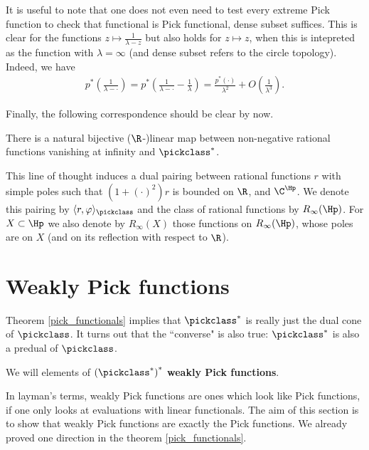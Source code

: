 It is useful to note that one does not even need to test every extreme Pick function to check that functional is Pick functional, dense subset suffices. This is clear for the functions $z \mapsto \frac{1}{\lambda - z}$ but also holds for $z \mapsto z$, when this is intepreted as the function with $\lambda = \infty$ (and dense subset refers to the circle topology). Indeed, we have
\begin{align*}
	p^{*}\left(\frac{1}{\lambda - \cdot}\right) = p^{*}\left(\frac{1}{\lambda - \cdot} - \frac{1}{\lambda}\right) = \frac{p^{*}(\cdot)}{\lambda^2} + O\left(\frac{1}{\lambda^3}\right).
\end{align*}

Finally, the following correspondence should be clear by now.

\begin{prop}
	There is a natural bijective ($\R$-)linear map between non-negative rational functions vanishing at infinity and $\pickclass^{*}$.
\end{prop}

This line of thought induces a dual pairing between rational functions $r$ with simple poles such that $(1 + (\cdot)^2) r$ is bounded on $\R$, and $\C^{\Hp}$. We denote this pairing by $\langle r, \varphi \rangle_{\pickclass}$ and the class of rational functions by $R_{\infty}(\Hp)$. For $X \subset \Hp$ we also denote by $R_{\infty}(X)$ those functions on $R_{\infty}(\Hp)$, whose poles are on $X$ (and on its reflection with respect to $\R$).

\section{Weakly Pick functions}

Theorem \ref{pick_functionals} implies that $\pickclass^{*}$ is really just the dual cone of $\pickclass$. It turns out that the ``converse" is also true: $\pickclass^{*}$ is also a predual of $\pickclass$.

\begin{maar}
	We will elements of $\left(\pickclass^{*}\right)^{*}$ \textbf{weakly Pick functions}.
\end{maar}

In layman's terms, weakly Pick functions are ones which look like Pick functions, if one only looks at evaluations with linear functionals. The aim of this section is to show that weakly Pick functions are exactly the Pick functions. We already proved one direction in the theorem \ref{pick_functionals}. 

